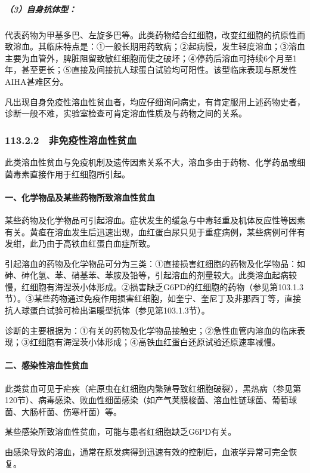 \subparagraph{（3）自身抗体型：}

代表药物为甲基多巴、左旋多巴等。此类药物结合红细胞，改变红细胞的抗原性而致溶血。其临床特点是：①一般长期用药致病；②起病慢，发生轻度溶血；③溶血主要为血管外，脾脏阻留致敏红细胞而使之破坏；④停药后溶血可持续6个月至1年，甚至更长；⑤直接及间接抗人球蛋白试验均可阳性。该型临床表现与原发性AIHA甚难区分。

凡出现自身免疫性溶血性贫血者，均应仔细询问病史，有肯定服用上述药物史者，诊断一般不难，实验室检查可肯定溶血性质及与药物之间的关系。

\subsubsection{113.2.2　非免疫性溶血性贫血}

此类溶血性贫血与免疫机制及遗传因素关系不大，溶血多由于药物、化学药品或细菌毒素直接作用于红细胞所引起。

\paragraph{一、化学物品及某些药物所致溶血性贫血}

某些药物及化学物品可引起溶血。症状发生的缓急与中毒轻重及机体反应性等因素有关。黄疸在溶血发生后迅速出现，血红蛋白尿只见于重症病例，某些病例可伴有发绀，此乃由于高铁血红蛋白血症所致。

引起溶血的药物及化学物品可分为三类：①直接损害红细胞的药物及化学物品：如砷、砷化氢、苯、硝基苯、苯胺及铅等，引起溶血的剂量较大。此类溶血起病较慢，红细胞有海涅茨小体形成。②损害缺乏G6PD的红细胞的药物（参见第103.1.3节）。③某些药物通过免疫作用损害红细胞，如奎宁、奎尼丁及非那西丁等，直接抗人球蛋白试验可检出温暖型抗体（参见第103.1.3节）。

诊断的主要根据为：①有关的药物及化学物品接触史；②急性血管内溶血的临床表现；③红细胞有海涅茨小体形成；④高铁血红蛋白还原试验还原速率减慢。

\paragraph{二、感染性溶血性贫血}

此类贫血可见于疟疾（疟原虫在红细胞内繁殖导致红细胞破裂），黑热病（参见第120节）、病毒感染、败血性细菌感染（如产气荚膜梭菌、溶血性链球菌、葡萄球菌、大肠杆菌、伤寒杆菌）等。

某些感染所致溶血性贫血，可能与患者红细胞缺乏G6PD有关。

由感染导致的溶血，通常在原发病得到迅速有效的控制后，血液学异常可完全恢复。

